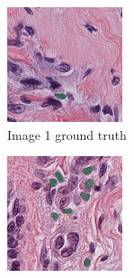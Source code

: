 \begin{figure}[H]
  \begin{subfigure}[b]{0.32\textwidth}
    \centering
    \includegraphics[width=\linewidth]{assets/images/for_presentation/exp3-1-gt.png}
    \caption{Image 1 ground truth}
  \end{subfigure}\hfill
  \begin{subfigure}[b]{0.32\textwidth}
    \centering
    \includegraphics[width=\linewidth]{assets/images/for_presentation/exp3-2-gt.png}

\end{subfigure}
\end{figure}
